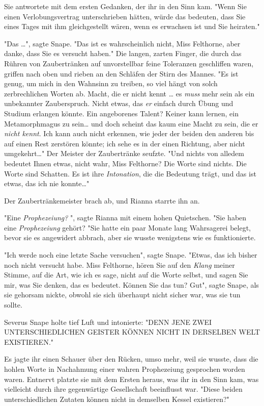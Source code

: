 {Sie antwortete mit dem ersten Gedanken, der ihr in den Sinn kam. "Wenn Sie einen Verlobungsvertrag unterschrieben hätten, würde das bedeuten, dass Sie eines Tages mit ihm gleichgestellt wären, wenn es erwachsen ist und Sie heiraten."

"Das …", sagte Snape. "Das ist es wahrscheinlich nicht, Miss Felthorne, aber danke, dass Sie es versucht haben." Die langen, zarten Finger, die durch das Rühren von Zaubertränken auf unvorstellbar feine Toleranzen geschliffen waren, griffen nach oben und rieben an den Schläfen der Stirn des Mannes. "Es ist genug, um mich in den Wahnsinn zu treiben, so viel hängt von solch zerbrechlichen Worten ab. Macht, die er nicht kennt … es \emph{muss} mehr sein als ein unbekannter Zauberspruch. Nicht etwas, das \emph{er} einfach durch Übung und Studium erlangen könnte. Ein angeborenes Talent? Keiner kann lernen, ein Metamorphmagus zu sein… und doch scheint das kaum eine Macht zu sein, die er \emph{nicht kennt}. Ich kann auch nicht erkennen, wie jeder der beiden den anderen bis auf einen Rest zerstören könnte; ich sehe es in der einen Richtung, aber nicht umgekehrt…" Der Meister der Zaubertränke seufzte. "Und nichts von alledem bedeutet Ihnen etwas, nicht wahr, Miss Felthorne? Die Worte sind nichts. Die Worte sind Schatten. Es ist ihre \emph{Intonation}, die die Bedeutung trägt, und das ist etwas, das ich nie konnte…"

Der Zaubertränkemeister brach ab, und Rianna starrte ihn an.

"Eine \emph{Prophezeiung?} ", sagte Rianna mit einem hohen Quietschen. "Sie haben eine \emph{Prophezeiung} gehört? "Sie hatte ein paar Monate lang Wahrsagerei belegt, bevor sie es angewidert abbrach, aber sie wusste wenigstens wie es funktionierte.

"Ich werde noch eine letzte Sache versuchen", sagte Snape. "Etwas, das ich bisher noch nicht versucht habe. Miss Felthorne, hören Sie auf den \emph{Klang} meiner Stimme, auf die Art, wie ich es sage, nicht auf die Worte selbst, und sagen Sie mir, was Sie denken, das es bedeutet. Können Sie das tun? Gut", sagte Snape, als sie gehorsam nickte, obwohl sie sich überhaupt nicht sicher war, was sie tun sollte.

Severus Snape holte tief Luft und intonierte: "DENN JENE ZWEI UNTERSCHIEDLICHEN GEISTER KÖNNEN NICHT IN DERSELBEN WELT EXISTIEREN."

Es jagte ihr einen Schauer über den Rücken, umso mehr, weil sie wusste, dass die hohlen Worte in Nachahmung einer wahren Prophezeiung gesprochen worden waren. Entnervt platzte sie mit dem Ersten heraus, was ihr in den Sinn kam, was vielleicht durch ihre gegenwärtige Gesellschaft beeinflusst war. "Diese beiden unterschiedlichen Zutaten können nicht in demselben Kessel existieren?"

}
